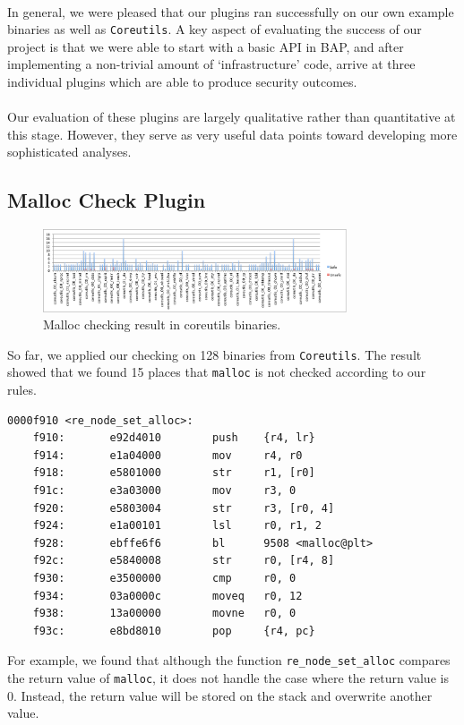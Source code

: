 \documentclass[letterpaper,11pt]{article}
\begin{document}
\paragraph{}
In general, we were pleased that our plugins ran successfully on our own
example binaries as well as \texttt{Coreutils}. A key aspect of evaluating
the success of our project is that we were able to start with a basic API in
BAP, and after implementing a non-trivial amount of `infrastructure' code,
arrive at three individual plugins which are able to produce security outcomes.

\paragraph{}
Our evaluation of these plugins are largely qualitative rather than
quantitative at this stage. However, they serve as very useful data points
toward developing more sophisticated analyses.

\subsection{Malloc Check Plugin}

\begin{figure}[h!]
      \caption{Malloc checking result in coreutils binaries.}
        \centering
    \includegraphics[width=0.8\textwidth]{malloccheckplot}
\end{figure}
So far, we applied our checking on 128 binaries from \texttt{Coreutils}. The
result showed that we found 15 places that \texttt{malloc} is not checked
according to our rules.
\begin{center}
\lstset{language=C, label=strcpy_asm,
caption=Function re\_node\_set\_alloc, breaklines=true, basicstyle=\tiny, numbers=none}
\begin{lstlisting}
0000f910 <re_node_set_alloc>:
    f910:       e92d4010        push    {r4, lr}
    f914:       e1a04000        mov     r4, r0
    f918:       e5801000        str     r1, [r0]
    f91c:       e3a03000        mov     r3, 0
    f920:       e5803004        str     r3, [r0, 4]
    f924:       e1a00101        lsl     r0, r1, 2
    f928:       ebffe6f6        bl      9508 <malloc@plt>
    f92c:       e5840008        str     r0, [r4, 8]
    f930:       e3500000        cmp     r0, 0
    f934:       03a0000c        moveq   r0, 12
    f938:       13a00000        movne   r0, 0
    f93c:       e8bd8010        pop     {r4, pc}
\end{lstlisting}
\end{center}
For example, we found that although the function \texttt{re\_node\_set\_alloc}
compares the return value of \texttt{malloc}, it does not handle the case
where the return value is 0. Instead, the return value will be stored on the
stack and overwrite another value.
\end{document}
